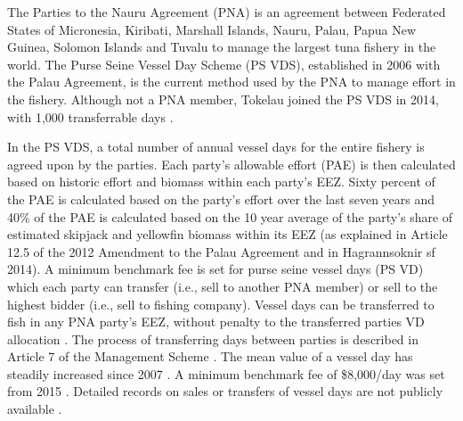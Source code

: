 \documentclass[11pt,english]{article}
\begin{document}
The Parties to the Nauru Agreement (PNA) is an agreement between Federated States of Micronesia, Kiribati, Marshall Islands, Nauru, Palau, Papua New Guinea, Solomon Islands and Tuvalu to manage the largest tuna fishery in the world. The Purse Seine Vessel Day Scheme (PS VDS), established in 2006 with the Palau Agreement, is the current method used by the PNA to manage effort in the fishery. Although not a PNA member, Tokelau joined the PS VDS in 2014, with 1,000 transferrable days \citep{PNA2014}.

In the PS VDS, a total number of annual vessel days for the entire fishery is agreed upon by the parties. Each party’s allowable effort (PAE) is then calculated based on historic effort and biomass within each party’s EEZ. Sixty percent of the PAE is calculated based on the party’s effort over the last seven years and 40\% of the PAE is calculated based on the 10 year average of the party’s share of estimated skipjack and yellowfin biomass within its EEZ (as explained in Article 12.5 of the 2012 Amendment to the Palau Agreement and in Hagrannsoknir sf 2014). 
A minimum benchmark fee is set for purse seine vessel days (PS VD) which each party can transfer (i.e., sell to another PNA member) or sell to the highest bidder (i.e., sell to fishing company). Vessel days can be transferred to fish in any PNA party’s EEZ, without penalty to the transferred parties VD allocation \citep{PNA2016}. The process of transferring days between parties is described in Article 7 of the Management Scheme \citep{PNA2016}. The mean value of a vessel day has steadily increased since 2007 \citep{havice_2013}. A minimum benchmark fee of \$8,000/day was set from 2015 \citep{PNA2014a}. Detailed records on sales or transfers of vessel days are not publicly available \citep{havice_2013,yeeting2018stabilising}. 
\end{document}
